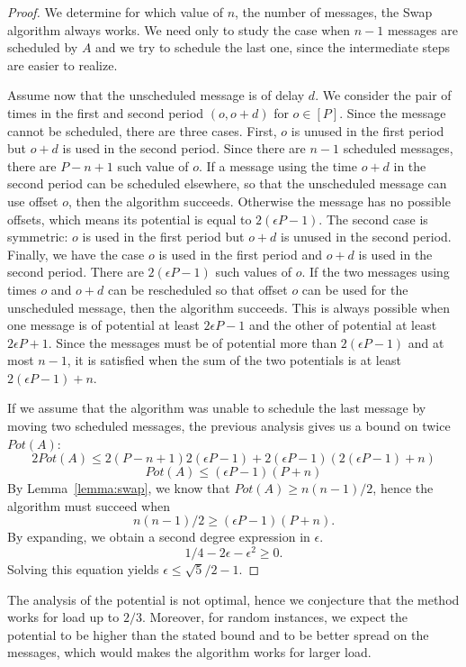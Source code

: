 \documentclass[a4paper,UKenglish,cleveref, autoref, thm-restate]{lipics-v2019}
\begin{document}
\begin{proof}
We determine for which value of $n$, the number of messages, the Swap algorithm
always works. We need only to study the case when $n-1$ messages are scheduled by $A$
and we try to schedule the last one, since the intermediate steps are easier to realize. 

Assume now that the unscheduled message is of delay $d$. We consider the pair 
of times in the first and second period $(o,o+d)$ for $o \in [P]$. Since the message
cannot be scheduled, there are three cases. First, $o$ is unused in the first period but $o+d$ is used in the second period. Since there are $n-1$ scheduled messages, there are $P-n+1$ such value of $o$. If a message using the time $o+d$ in the second period can be scheduled elsewhere, so that the unscheduled message can use offset $o$, then the algorithm succeeds.
Otherwise the message has no possible offsets, which means its potential is equal to $2(\epsilon P -1)$.
The second case is symmetric: $o$ is used in the first period but $o+d$ is unused in the second period. 
Finally, we have the case $o$ is used in the first period and $o+d$ is used in the second period.  There are $2(\epsilon P -1)$ such values of $o$. If the two messages using times 
$o$ and $o+d$ can be rescheduled so that offset $o$ can be used for the unscheduled message,
then the algorithm succeeds. This is always possible when one message is of potential at least $2\epsilon P -1$ and the other of potential at least $2\epsilon P + 1$. Since the messages must be of potential more than $2(\epsilon P -1)$ and at most $n-1$, it is satisfied when the sum of the two potentials is at least $2(\epsilon P -1) + n$.

If we assume that the algorithm was unable to schedule the last message by moving two scheduled messages, the previous analysis gives us a bound on twice $Pot(A)$: 
$$ 2Pot(A) \leq 2(P-n+1) 2(\epsilon P -1) + 2(\epsilon P -1)(2(\epsilon P -1) + n) $$
$$ Pot(A) \leq (\epsilon P -1) (P + n)$$
By Lemma~\ref{lemma:swap}, we know that $Pot(A) \geq n(n-1)/2$, hence 
the algorithm must succeed when
$$n(n-1)/2 \geq  (\epsilon P -1) (P + n).$$
By expanding, we obtain a second degree expression in $\epsilon$.
$$1/4 - 2\epsilon - \epsilon ^2 \geq  0.$$
Solving this equation yields $\epsilon \leq \sqrt{5}/2 -1$.
\end{proof}

The analysis of the potential is not optimal, hence we conjecture that the method works
for load up to $2/3$. Moreover, for random instances, we expect the potential to be higher 
than the stated bound and to be better spread on the messages, which would makes the algorithm
works for larger load.
\end{document}
